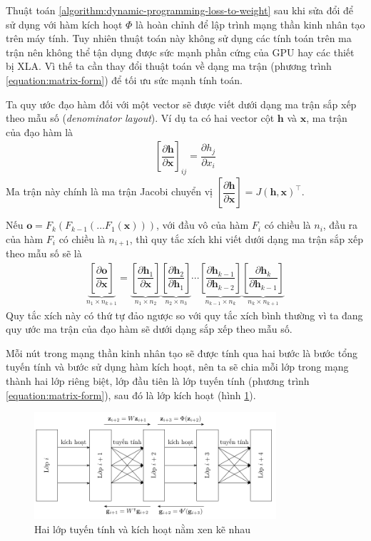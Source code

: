 Thuật toán \ref{algorithm:dynamic-programming-loss-to-weight} sau khi sửa đổi để sử dụng với hàm kích hoạt $\Phi$ là hoàn chỉnh để lập trình mạng thần kinh nhân tạo trên máy tính. Tuy nhiên thuật toán này không sử dụng các tính toán trên ma trận nên không thể tận dụng được sức mạnh phần cứng của GPU hay các thiết bị XLA. Vì thế ta cần thay đổi thuật toán về dạng ma trận (phương trình \ref{equation:matrix-form}) để tối ưu sức mạnh tính toán.

Ta quy ước đạo hàm đối với một vector sẽ được viết dưới dạng ma trận sắp xếp theo mẫu số (\textit{denominator layout}). Ví dụ ta có hai vector cột $\textbf{h}$ và $\textbf{x}$, ma trận của đạo hàm là
\begin{align}
    \left[\dfrac{\partial\mathbf{h}}{\partial\mathbf{x}}\right]_{ij}=\dfrac{\partial h_j}{\partial x_i}
\end{align}
Ma trận này chính là ma trận Jacobi chuyển vị $\left[\dfrac{\partial\mathbf{h}}{\partial\mathbf{x}}\right]=J(\mathbf{h},\mathbf{x})^\intercal$.

Nếu $\mathbf{o}=F_k(F_{k-1}(\dots F_1(\mathbf{x})))$, với đầu vô của hàm $F_i$ có chiều là $n_i$, đầu ra của hàm $F_i$ có chiều là $n_{i+1}$, thì quy tắc xích khi viết dưới dạng ma trận sắp xếp theo mẫu số sẽ là
\begin{align}
    \underbrace{\left[\dfrac{\partial\mathbf o}{\partial\mathbf x}\right]}_{n_1\times n_{k+1}}=
    \underbrace{\left[\dfrac{\partial\mathbf h_1}{\partial\mathbf x}\right]}_{n_1\times n_2}
    \underbrace{\left[\dfrac{\partial\mathbf h_2}{\partial\mathbf h_1}\right]}_{n_2\times n_3}\cdots
    \underbrace{\left[\dfrac{\partial\mathbf h_{k-1}}{\partial\mathbf h_{k-2}}\right]}_{n_{k-1}\times n_k}
    \underbrace{\left[\dfrac{\partial\mathbf h_k}{\partial\mathbf h_{k-1}}\right]}_{n_k\times n_{k+1}}
\end{align}
Quy tắc xích này có thứ tự đảo ngược so với quy tắc xích bình thường vì ta đang quy ước ma trận của đạo hàm sẽ dưới dạng sắp xếp theo mẫu số.

Mỗi nút trong mạng thần kinh nhân tạo sẽ được tính qua hai bước là bước tổng tuyến tính và bước sử dụng hàm kích hoạt, nên ta sẽ chia mỗi lớp trong mạng thành hai lớp riêng biệt, lớp đầu tiên là lớp tuyến tính (phương trình \ref{equation:matrix-form}), sau đó là lớp kích hoạt (hình \ref{figure:multi-layer-linear-activation-matrix}).
\begin{figure}[htb]
    \centering
    \includegraphics[width=0.8\textwidth]{tikz_image/multi_layer_linear_activation_matrix.pdf}
    \caption{Hai lớp tuyến tính và kích hoạt nằm xen kẽ nhau}
    \label{figure:multi-layer-linear-activation-matrix}
\end{figure}

